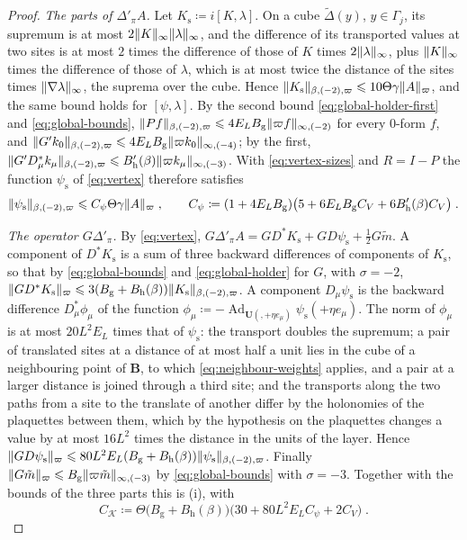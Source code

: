 \documentclass[11pt]{preprint}
\makeatletter
\newcommand{\Ad}{\operatorname{Ad}}
\DeclarePairedDelimiter{\norm}{\lVert}{\rVert}
\newcommand*{\bigcdot}{}%
\DeclareRobustCommand*{\bigcdot}{%
	\mathbin{\mathpalette\bigcdot@{}}%
}
\newcommand*{\bigcdot@scalefactor}{.7}
\newcommand*{\bigcdot@widthfactor}{1.15}
\newcommand*{\bigcdot@}[2]{%
	\sbox0{$#1\vcenter{}$}%
	\sbox2{$#1\cdot\m@th$}%
	\hbox to \bigcdot@widthfactor\wd2{%
		\hss
		\raise\ht0\hbox{%
			\scalebox{\bigcdot@scalefactor}{%
				\lower\ht0\hbox{$#1\bullet\m@th$}%
			}%
		}%
		\hss
	}%
}
\numberwithin{equation}{section}
\makeatother
\begin{document}
\begin{proof}
\emph{The parts of $\Delta'_\pi A$.} Let $K_{\mathrm s} \coloneqq i[K, \lambda]$. On a cube $\tilde\Delta(y)$, $y \in \Gamma_j$, its supremum is at most $2\norm K_\infty\norm\lambda_\infty$, and the difference of its transported values at two sites is at most $2$ times the difference of those of $K$ times $2\norm\lambda_\infty$, plus $\norm K_\infty$ times the difference of those of $\lambda$, which is at most twice the distance of the sites times $\norm{\nabla\lambda}_\infty$, the suprema over the cube. Hence $\norm{K_{\mathrm s}}_{\beta,(-2),\varpi} \leqslant 10\Theta\gamma\norm A_\varpi$, and the same bound holds for $[\psi, \lambda]$. By the second bound \eqref{eq:global-holder-first} and \eqref{eq:global-bounds}, $\norm{Pf}_{\beta,(-2),\varpi} \leqslant 4E_LB_{\mathrm g}\norm{\varpi f}_{\infty,(-2)}$ for every $0$-form $f$, and $\norm{G'k_0}_{\beta,(-2),\varpi} \leqslant 4E_LB_{\mathrm g}\norm{\varpi k_0}_{\infty,(-4)}$; by the first, $\norm{G'D^*_\mu k_\mu}_{\beta,(-2),\varpi} \leqslant B'_{\mathrm h}(\beta)\norm{\varpi k_\mu}_{\infty,(-3)}$. With \eqref{eq:vertex-sizes} and $R = I - P$ the function $\psi_{\mathrm s}$ of \eqref{eq:vertex} therefore satisfies
\[
    \norm{\psi_{\mathrm s}}_{\beta,(-2),\varpi} \leqslant C_\psi\Theta\gamma\norm A_\varpi\;,
    \qquad
    C_\psi \coloneqq (1 + 4E_LB_{\mathrm g})\bigl(5 + 6E_LB_{\mathrm g}C_V + 6B'_{\mathrm h}(\beta)C_V\bigr)\;.
\]

\emph{The operator $G\Delta'_\pi$.} By \eqref{eq:vertex}, $G\Delta'_\pi A = GD^*K_{\mathrm s} + GD\psi_{\mathrm s} + \frac{1}{2}G\tilde m$. A component of $D^*K_{\mathrm s}$ is a sum of three backward differences of components of $K_{\mathrm s}$, so that by \eqref{eq:global-bounds} and \eqref{eq:global-holder} for $G$, with $\sigma = -2$, $\norm{GD^*K_{\mathrm s}}_\varpi \leqslant 3(B_{\mathrm g} + B_{\mathrm h}(\beta))\norm{K_{\mathrm s}}_{\beta,(-2),\varpi}$. A component $D_\mu\psi_{\mathrm s}$ is the backward difference $D^*_\mu\phi_\mu$ of the function $\phi_\mu \coloneqq -\Ad_{\mathbf U(\bigcdot, \bigcdot + \eta e_\mu)}\psi_{\mathrm s}(\bigcdot +\eta e_\mu)$. The norm of $\phi_\mu$ is at most $20L^2E_L$ times that of $\psi_{\mathrm s}$: the transport doubles the supremum; a pair of translated sites at a distance of at most half a unit lies in the cube of a neighbouring point of $\mathbf B$, to which \eqref{eq:neighbour-weights} applies, and a pair at a larger distance is joined through a third site; and the transports along the two paths from a site to the translate of another differ by the holonomies of the plaquettes between them, which by the hypothesis on the plaquettes changes a value by at most $16L^2$ times the distance in the units of the layer. Hence $\norm{GD\psi_{\mathrm s}}_\varpi \leqslant 80L^2E_L(B_{\mathrm g} + B_{\mathrm h}(\beta))\norm{\psi_{\mathrm s}}_{\beta,(-2),\varpi}$. Finally $\norm{G\tilde m}_\varpi \leqslant B_{\mathrm g}\norm{\varpi\tilde m}_{\infty,(-3)}$ by \eqref{eq:global-bounds} with $\sigma = -3$. Together with the bounds of the three parts this is (i), with
\[
    C_{\mathcal K} \coloneqq \Theta\bigl(B_{\mathrm g} + B_{\mathrm h}(\beta)\bigr)\bigl(30 + 80L^2E_LC_\psi + 2C_V\bigr)\;.
\]


\end{proof}
\end{document}
